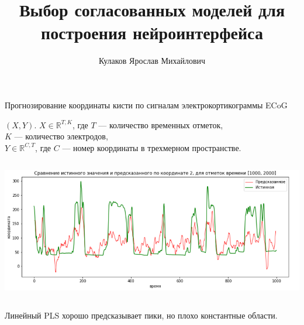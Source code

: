 \documentclass{beamer}
\title[\hbox to 56mm{Порождение признаков}]{Выбор согласованных моделей для \\ построения нейроинтерфейса}
\author[Я. Кулаков]{Кулаков Ярослав Михайлович}
\institute{Московский физико-технический институт}
\date{\footnotesize
\par\smallskip\emph{Курс:} Автоматизация научных исследований\par (практика, В.\,В.~Стрижов)/Группа 813
\par\smallskip\emph{Эксперт:} В~.Стрижов
\par\smallskip\emph{Консультант:} Р.~Исаченко
\par\bigskip\small 2021}
\begin{document}
\begin{frame}
\thispagestyle{empty}
\maketitle
\end{frame}


\begin{frame}{Прогнозирование координаты кисти по сигналам электрокортикограммы ECoG}

$(X, Y).$ $ X \in \mathds{R}^{T, K}$, где $T$ --- количество временных отметок,\\
$K$ ---  количество электродов,\\
$Y \in \mathds{R}^{C, T}$, где $C$ --- номер координаты в трехмерном пространстве.

\begin{columns}[c]
\includegraphics[width=1.0\textwidth]{images/predicted_actual_coords}

\end{columns}

\bigskip

Линейный {\color{red}PLS} хорошо предсказывает пики, но плохо константные области.
\end{frame}


\end{document}
